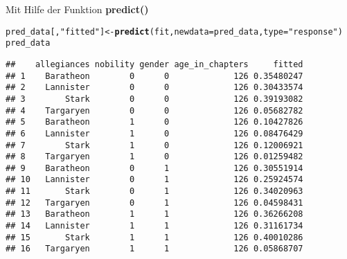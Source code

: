 \documentclass{article}\usepackage[]{graphicx}\usepackage[]{color}
\makeatletter
\newcommand{\hlstr}[1]{\textcolor[rgb]{0.192,0.494,0.8}{#1}}%
\newcommand{\hlstd}[1]{\textcolor[rgb]{0.345,0.345,0.345}{#1}}%
\newcommand{\hlkwb}[1]{\textcolor[rgb]{0.69,0.353,0.396}{#1}}%
\newcommand{\hlkwc}[1]{\textcolor[rgb]{0.333,0.667,0.333}{#1}}%
\newcommand{\hlkwd}[1]{\textcolor[rgb]{0.737,0.353,0.396}{\textbf{#1}}}%
\newenvironment{kframe}{%
 \def\at@end@of@kframe{}%
 \ifinner\ifhmode%
  \def\at@end@of@kframe{\end{minipage}}%
  \begin{minipage}{\columnwidth}%
 \fi\fi%
 \def\FrameCommand##1{\hskip\@totalleftmargin \hskip-\fboxsep
 \colorbox{shadecolor}{##1}\hskip-\fboxsep
     \hskip-\linewidth \hskip-\@totalleftmargin \hskip\columnwidth}%
 \MakeFramed {\advance\hsize-\width
   \@totalleftmargin\z@ \linewidth\hsize
   \@setminipage}}%
 {\par\unskip\endMakeFramed%
 \at@end@of@kframe}
\newenvironment{knitrout}{}{} %
\makeatother
\begin{document}
Mit Hilfe der Funktion \textbf{predict()}

\begin{knitrout}
\color{fgcolor}\begin{kframe}
\begin{alltt}
\hlstd{pred_data[,} \hlstr{"fitted"}\hlstd{]} \hlkwb{<-} \hlkwd{predict}\hlstd{(fit,} \hlkwc{newdata} \hlstd{= pred_data,} \hlkwc{type} \hlstd{=} \hlstr{"response"}\hlstd{)}
\hlstd{pred_data}
\end{alltt}
\begin{verbatim}
##    allegiances nobility gender age_in_chapters     fitted
## 1    Baratheon        0      0             126 0.35480247
## 2    Lannister        0      0             126 0.30433574
## 3        Stark        0      0             126 0.39193082
## 4    Targaryen        0      0             126 0.05682782
## 5    Baratheon        1      0             126 0.10427826
## 6    Lannister        1      0             126 0.08476429
## 7        Stark        1      0             126 0.12006921
## 8    Targaryen        1      0             126 0.01259482
## 9    Baratheon        0      1             126 0.30551914
## 10   Lannister        0      1             126 0.25924574
## 11       Stark        0      1             126 0.34020963
## 12   Targaryen        0      1             126 0.04598431
## 13   Baratheon        1      1             126 0.36266208
## 14   Lannister        1      1             126 0.31161734
## 15       Stark        1      1             126 0.40010286
## 16   Targaryen        1      1             126 0.05868707
\end{verbatim}
\end{kframe}
\end{knitrout}
\end{document}
